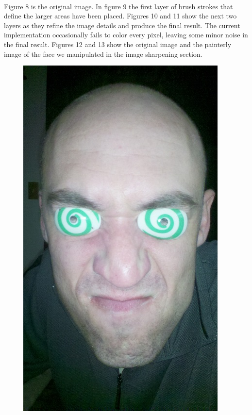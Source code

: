 \documentclass[10pt,twocolumn]{article}
\begin{document}
	\paragraph{} Figure 8 is the original image.  In figure 9 the first layer of brush strokes that define the larger areas have been placed.  Figures 10 and 11 show the next two layers as they refine the image details and produce the final result.  The current implementation occasionally fails to color every pixel, leaving some minor noise in the final result.  Figures 12 and 13 show the original image and the painterly image of the face we manipulated in the image sharpening section.

\begin{figure}
\centering
\begin{minipage}{0.24\textwidth}
\centering \includegraphics[width=\textwidth]{test3.jpg}

\end{minipage}
\end{figure}
\end{document}
